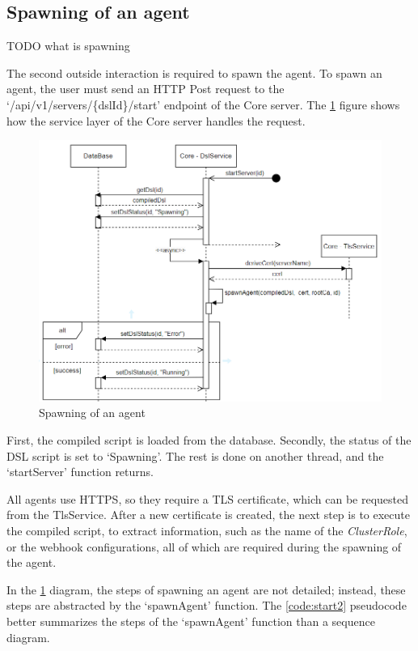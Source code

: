 \subsection{Spawning of an agent}
\label{sec:spawning}

TODO what is spawning

The second outside interaction is required to spawn the agent. To spawn an agent, the user must send an HTTP Post request to the `/api/v1/servers/\{dslId\}/start' endpoint of the Core server. The \ref{fig:start1} figure shows how the service layer of the Core server handles the request.

\begin{figure}[h]
    \centering
    \includegraphics[width=130mm, keepaspectratio]{seq5.png}
    \caption{Spawning of an agent}
    \label{fig:start1}
\end{figure}

First, the compiled script is loaded from the database. Secondly, the status of the DSL script is set to `Spawning'. The rest is done on another thread, and the `startServer' function returns.

All agents use HTTPS, so they require a TLS certificate, which can be requested from the TlsService.
After a new certificate is created, the next step is to execute the compiled script, to extract information, such as the name of the \emph{ClusterRole}, or the webhook configurations, all of which are required during the spawning of the agent.

In the \ref{fig:start1} diagram, the steps of spawning an agent are not detailed; instead, these steps are abstracted by the `spawnAgent' function. The \ref{code:start2} pseudocode better summarizes the steps of the `spawnAgent' function than a sequence diagram.

